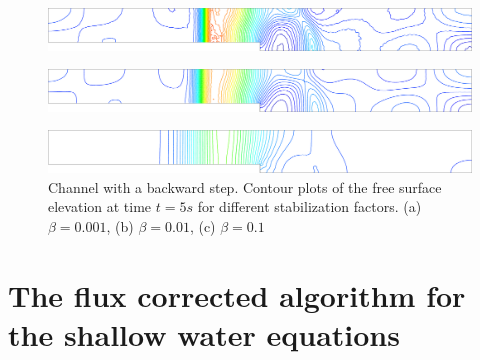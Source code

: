 \begin{figure}[H]
    \begin{subfigure}{.05\textwidth}
        \caption{}
    \end{subfigure}
    \begin{minipage}[c]{.94\textwidth}
        \includegraphics[width=\textwidth]{img/eulerian/step/stab_0.001_time_5.pdf}
    \end{minipage}
    \par\medskip
    \begin{subfigure}{.05\textwidth}
        \caption{}
    \end{subfigure}
    \begin{minipage}[c]{.94\textwidth}
        \includegraphics[width=\textwidth]{img/eulerian/step/stab_0.01_time_5.pdf}
    \end{minipage}
    \par\medskip
    \begin{subfigure}{.05\textwidth}
        \caption{}
    \end{subfigure}
    \begin{minipage}[c]{.94\textwidth}
        \includegraphics[width=\textwidth]{img/eulerian/step/stab_0.1_time_5.pdf}
    \end{minipage}
\caption{Channel with a backward step. Contour plots of the free surface elevation at time $t=5s$ for different stabilization factors. (a) $\beta=0.001$, (b) $\beta=0.01$, (c) $\beta=0.1$}
\label{stab_parameters_time2}
\end{figure}








\section{The flux corrected algorithm for the shallow water equations}
\label{sec:sw_fc}



